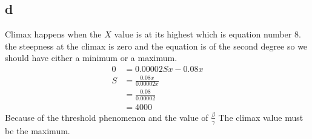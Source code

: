 \documentclass[a4paper, 11pt]{article}
\begin{document}
\subsection{d}
Climax happens when the $X$ value is at its highest which is equation number 8.
the steepness at the climax is zero and the equation is of the second degree so
we should have either a minimum or a maximum.
\begin{equation}
    \begin{aligned}
        0 &= 0.00002 Sx - 0.08x \\
        S &= \frac{0.08x}{0.00002x} \\
          &= \frac{0.08}{0.00002} \\
          &= 4000
    \end{aligned}
\end{equation}
Because of the threshold phenomenon and the value of $\frac{\beta}{\gamma}$
The climax value must be the maximum.
\end{document}

